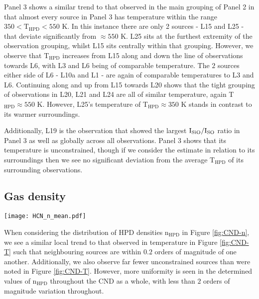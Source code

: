 \documentclass[twocolumn]{aastex631}
\begin{document}
Panel 3 shows a similar trend to that observed in the main grouping of Panel 2 in that almost every source in Panel 3 has temperature within the range $350 < \mathrm{T_{{HPD}}} < 550 $ \si{\kelvin}. In this instance there are only 2 sources - L15 and L25 - that deviate significantly from $\approx 550$ \si{\kelvin}. L25 sits at the furthest extremity of the observation grouping, whilst L15 sits centrally within that grouping. However, we observe that T$_{\mathrm{HPD}}$ increases from L15 along and down the line of observations towards L6, with L3 and L6 being of comparable temperature. The $2$ sources either side of L6 - L10a and L1 - are again of comparable temperatures to L3 and L6. Continuing along and up from L15 towards L20 shows that the tight grouping of observations in L20, L21 and L24 are all of similar temperature, again T$_{\mathrm{HPD}} \approx 550$ \si{\kelvin}. However, L25's temperature of T$_{\mathrm{HPD}} \approx 350$ \si{\kelvin} stands in contrast to its warmer surroundings. 

Additionally, L19 is the observation that showed the largest $\mathrm{I}_{\ce{SiO}}/\mathrm{I}_{\ce{SO}}$ ratio in Panel 3 as well as globally across all observations. Panel 3 shows that its temperature is unconstrained, though if we consider the estimate in relation to its surroundings then we see no significant deviation from the average T$_{\mathrm{HPD}}$ of its surrounding observations. 


\subsection{Gas density} \label{sec:CND-gas-cond-n}

\begin{figure*}
    \centering
    \texttt{[image: HCN\_n\_mean.pdf]}
    \caption{As per Figure \ref{fig:CND-T}, but here the colour of the circular regions represents Hydrogen gas density n$_{\mathrm{H}}$ towards each position outlined in Section \ref{sec:obs}. Again, semi-transparent, hatched circular regions indicate a source whose chain has not reliably converged.}
    \label{fig:CND-n}
\end{figure*}

When considering the distribution of HPD densities n$_{\mathrm{HPD}}$ in Figure \ref{fig:CND-n}, we see a similar local trend to that observed in temperature in Figure \ref{fig:CND-T} such that neighbouring sources are within $0.2$ orders of magnitude of one another. Additionally, we also observe far fewer unconstrained sources than were noted in Figure \ref{fig:CND-T}. However, more uniformity is seen in the determined values of n$_{\mathrm{HPD}}$ throughout the CND as a whole, with less than $2$ orders of magnitude variation throughout. 
\end{document}
